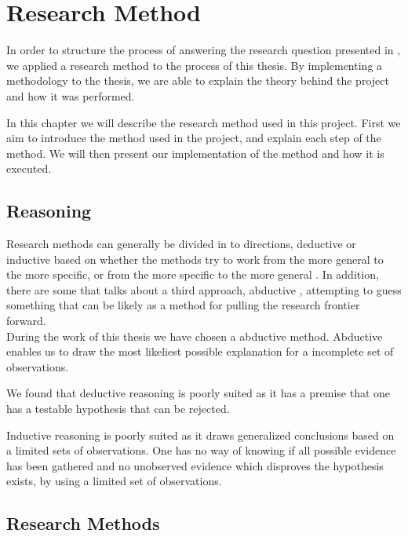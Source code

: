 
\chapter{Research Method} %
\label{cha:research_questions_and_method}
In order to structure the process of answering the research question presented
in , we applied a research method to the 
process of this thesis. By implementing a methodology to the thesis, we are
able to explain the theory behind the project and how it was performed.

In this chapter we will describe the research method used in this project.
First we aim to introduce the method used in the project, and explain each step
of the method. We will then present our implementation of the method and how it
is executed.

\section{Reasoning} %
\label{sec:reasoning}
Research methods can generally be divided in to directions, deductive or
inductive based on whether the methods try to work from the more general to the
more specific, or from the more specific to the more general 
\cite{ deductionAndInductionTrochim}. In addition, there are some that talks about a
third approach, abductive \cite{ wiki:abductiveReasoning}, attempting to guess 
something that can be likely as a method for pulling the research frontier 
forward.\\

During the work of this thesis we have chosen a abductive method. Abductive
enables us to draw the most likeliest possible explanation for a incomplete set
of observations.

We found that deductive reasoning is poorly suited as it has a premise that 
one has a testable hypothesis that can be rejected. %

Inductive reasoning is poorly suited as it draws generalized conclusions based
on a limited sets of observations. One has no way of knowing if all possible
evidence has been gathered and no unobserved evidence which disproves the
hypothesis exists, by using a limited set of observations\cite{ deductionAndInductionButte}.

\section{Research Methods} %
\label{sec:research_method}

